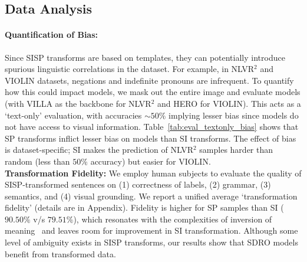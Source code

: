 \subsection{Data Analysis}
\label{sec:sisp_fidelity_bias}
\paragraph{Quantification of Bias:}

Since SISP transforms are based on templates, they can potentially introduce spurious linguistic correlations in the dataset.
For example, in NLVR$^2$ and VIOLIN datasets, negations and indefinite pronouns
are infrequent.
To quantify how this could impact models, we mask out the entire image and evaluate models (with VILLA as the backbone for NLVR$^2$ and HERO for VIOLIN).
This acts as a `text-only' evaluation, with accuracies ${\sim}50\%$ implying lesser bias since models do not have access to visual information.
Table~\ref{tab:eval_textonly_bias} shows that SP transforms inflict lesser bias on models than SI transforms.
The effect of bias is dataset-specific; SI makes the prediction of NLVR$^2$ samples harder than random (less than $50\%$ accuracy) but easier for VIOLIN.\\


\noindent\textbf{Transformation Fidelity:}
We employ human subjects to evaluate the quality of SISP-transformed sentences on (1) correctness of labels, (2) grammar, (3) semantics, and (4) visual grounding. 
We report a unified average `transformation fidelity' (details are in Appendix).
Fidelity is higher for SP samples than SI ($90.50\%$ v/s $79.51\%$), which resonates with the complexities of inversion of meaning~\citep{russell1905denoting} and leaves room for improvement in SI transformation.
Although some level of ambiguity exists in SISP transforms, our results show that SDRO models benefit from transformed data.

